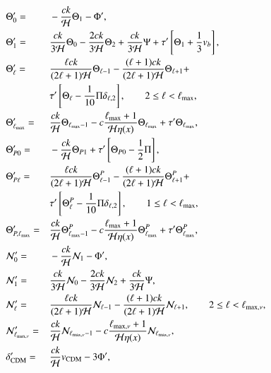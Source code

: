 \documentclass{aa}
\begin{document}
\begin{align*}
&\Theta^\prime_0 =&& -\frac{ck}{\mathcal{H}} \Theta_1 - \Phi^\prime, \\
&\Theta^\prime_1 =&&  \frac{ck}{3\mathcal{H}} \Theta_0 - \frac{2ck}{3\mathcal{H}}\Theta_2 +
\frac{ck}{3\mathcal{H}}\Psi + \tau^\prime\left[\Theta_1 + \frac{1}{3}v_b\right], \\
&\Theta^\prime_\ell =&& \frac{\ell ck}{(2\ell+1)\mathcal{H}}\Theta_{\ell-1} - \frac{(\ell+1)ck}{(2\ell+1)\mathcal{H}}
\Theta_{\ell+1} + \\&&&\tau^\prime\left[\Theta_\ell - \frac{1}{10}\Pi
\delta_{\ell,2}\right], \quad\quad 2 \le \ell < \ell_{\textrm{max}}, \\
&\Theta_{\ell_{\textrm{max}}}^\prime =&& \frac{ck}{\mathcal{H}}
\Theta_{\ell_{\textrm{max}}-1}-c\frac{\ell_{\textrm{max}}+1}{\mathcal{H}\eta(x)}\Theta_{\ell_{\textrm{max}}}+\tau^\prime\Theta_{\ell_{\textrm{max}}},\\
&\Theta^\prime_{P0} =&& -\frac{ck}{\mathcal{H}}\Theta_{P1} + \tau^\prime\left[\Theta_{P0} -
\frac{1}{2}\Pi \right],\\
&\Theta_{P\ell}^\prime =&& \frac{\ell ck}{(2\ell+1)\mathcal{H}} \Theta_{\ell-1}^P -
\frac{(\ell+1)ck}{(2\ell+1)\mathcal{H}} \Theta_{\ell+1}^P +\\& && \tau^\prime\left[\Theta_\ell^P -
\frac{1}{10}\Pi\delta_{\ell,2}\right],\quad\quad 1 \le \ell < \ell_{\textrm{max}}, \\
&\Theta_{P,\ell_{\textrm{max}}}^\prime =&& \frac{ck}{\mathcal{H}}
\Theta_{\ell_{\textrm{max}}-1}^P-c\frac{\ell_{\textrm{max}}+1}{\mathcal{H}\eta(x)}\Theta_{\ell_{\textrm{max}}}^P+\tau^\prime\Theta_{\ell_{\textrm{max}}}^P,\\
&\mathcal{N}^\prime_0 =&& -\frac{ck}{\mathcal{H}} \mathcal{N}_1 - \Phi^\prime, \\
&\mathcal{N}^\prime_1 =&&  \frac{ck}{3\mathcal{H}} \mathcal{N}_0 - \frac{2ck}{3\mathcal{H}}\mathcal{N}_2 + 
\frac{ck}{3\mathcal{H}}\Psi, \\
&\mathcal{N}^\prime_\ell =&& \frac{\ell ck}{(2\ell+1)\mathcal{H}} \mathcal{N}_{\ell-1} -
\frac{(\ell+1)ck}{(2\ell+1)\mathcal{H}}\mathcal{N}_{\ell+1},\quad\quad 2 \le \ell <
\ell_{\textrm{max},\nu}, \\
&\mathcal{N}_{\ell_{\textrm{max},\nu}}^\prime =&& \frac{ck}{\mathcal{H}}
\mathcal{N}_{\ell_{\textrm{max},\nu}-1}-c\frac{\ell_{\textrm{max},\nu}+1}{\mathcal{H}\eta(x)}\mathcal{N}_{\ell_{\textrm{max},\nu}},\\
&\delta_{\rm CDM}^\prime =&& \frac{ck}{\mathcal{H}} v_{\rm CDM} - 3\Phi^\prime, \\

\end{align*}
\end{document}
